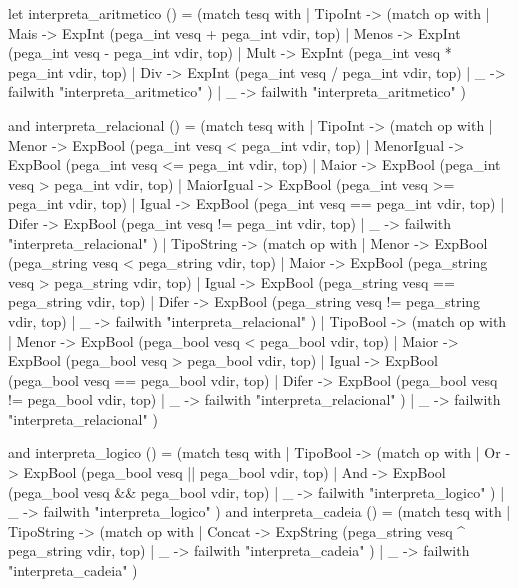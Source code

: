 \documentclass[12pt,a4paper,twoside]{article}
\begin{document}
\begin{terminal}
    let interpreta_aritmetico () =
      (match tesq with
       | TipoInt ->
         (match op with
          | Mais ->     ExpInt (pega_int vesq + pega_int vdir, top)
          | Menos -> ExpInt (pega_int vesq - pega_int vdir, top)
          | Mult ->     ExpInt (pega_int vesq * pega_int vdir, top)
          | Div  ->      ExpInt (pega_int vesq / pega_int vdir, top)
          | _ -> failwith "interpreta_aritmetico"
         )
       | _ -> failwith "interpreta_aritmetico"
      )

    and interpreta_relacional () =
      (match tesq with
       | TipoInt ->
         (match op with
          | Menor -> ExpBool (pega_int vesq < pega_int vdir, top)
          | MenorIgual -> ExpBool (pega_int vesq <= pega_int vdir, top)
          | Maior  -> ExpBool (pega_int vesq > pega_int vdir, top)
          | MaiorIgual -> ExpBool (pega_int vesq >= pega_int vdir, top)
          | Igual   -> ExpBool (pega_int vesq == pega_int vdir, top)
          | Difer   -> ExpBool (pega_int vesq != pega_int vdir, top)
          | _ -> failwith "interpreta_relacional"
         )
       | TipoString ->
         (match op with
          | Menor -> ExpBool (pega_string vesq < pega_string vdir, top)
          | Maior  -> ExpBool (pega_string vesq > pega_string vdir, top)
          | Igual   -> ExpBool (pega_string vesq == pega_string vdir, top)
          | Difer   -> ExpBool (pega_string vesq != pega_string vdir, top)
          | _ -> failwith "interpreta_relacional"
         )
       | TipoBool ->
         (match op with
          | Menor -> ExpBool (pega_bool vesq < pega_bool vdir, top)
          | Maior  -> ExpBool (pega_bool vesq > pega_bool vdir, top)
          | Igual   -> ExpBool (pega_bool vesq == pega_bool vdir, top)
          | Difer   -> ExpBool (pega_bool vesq != pega_bool vdir, top)
          | _ -> failwith "interpreta_relacional"
         )
       | _ ->  failwith "interpreta_relacional"
      )

    and interpreta_logico () =
      (match tesq with
       | TipoBool ->
         (match op with
          | Or -> ExpBool (pega_bool vesq || pega_bool vdir, top)
          | And ->   ExpBool (pega_bool vesq && pega_bool vdir, top)
          | _ ->  failwith "interpreta_logico"
         )
       | _ ->  failwith "interpreta_logico"
      )
    and interpreta_cadeia () =
      (match tesq with
       | TipoString ->
         (match op with
          | Concat -> ExpString (pega_string vesq ^ pega_string vdir, top)
          | _ ->  failwith "interpreta_cadeia"
         )
       | _ ->  failwith "interpreta_cadeia"
      )


\end{terminal}
\end{document}
